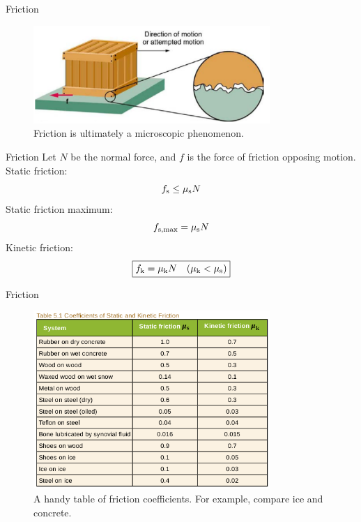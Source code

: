 \documentclass{beamer}
\begin{document}
\begin{frame}{Friction}
\begin{figure}
\centering
\includegraphics[width=0.8\textwidth]{figures/friction.png}
\caption{\label{fig:fric} Friction is ultimately a microscopic phenomenon.}
\end{figure}
\end{frame}

\begin{frame}{Friction}
Let $N$ be the normal force, and $f$ is the force of friction opposing motion. \\
\vspace{0.5cm}
Static friction: \\
\begin{equation}
f_{\rm s} \leq \mu_{\rm s} N
\end{equation}
Static friction maximum: \\
\begin{equation}
f_{\rm s,max} = \mu_{\rm s} N
\end{equation}
Kinetic friction: \\
\begin{equation}
\boxed{
f_{\rm k} = \mu_{\rm k} N ~~~ (\mu_{\rm k} < \mu_{\rm s})}
\end{equation}
\end{frame}

\begin{frame}{Friction}
\begin{figure}
\centering
\includegraphics[width=0.8\textwidth]{figures/friction2.png}
\caption{\label{fig:fric2} A handy table of friction coefficients.  For example, compare ice and concrete.}
\end{figure}
\end{frame}
\end{document}
